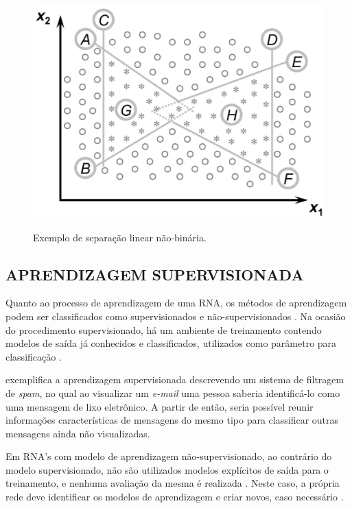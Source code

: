 \begin{figure}[h]
	\caption{Exemplo de separação linear não-binária.}
	\centering %
	\includegraphics[width=12cm]{resources/multilayer_perceptron.png} %
	\label{figura:multilayer_perceptron}	
\end{figure}

\subsection{APRENDIZAGEM SUPERVISIONADA}

Quanto ao processo de aprendizagem de uma RNA, os métodos de aprendizagem podem ser classificados como supervisionados e não-supervisionados \cite{haykin2007redes}. Na ocasião do procedimento supervisionado, há um ambiente de treinamento contendo modelos de saída já conhecidos e classificados, utilizados como parâmetro para classificação \cite{marius2009}.

 exemplifica a aprendizagem supervisionada descrevendo um sistema de filtragem de \textit{spam}, no qual ao visualizar um \textit{e-mail} uma pessoa saberia identificá-lo como uma mensagem de lixo eletrônico. A partir de então, seria possível reunir informações características de mensagens do mesmo tipo para classificar outras mensagens ainda não visualizadas.

Em RNA's com modelo de aprendizagem não-supervisionado, ao contrário do modelo supervisionado, não são utilizados modelos explícitos de saída para o treinamento, e nenhuma avaliação da mesma é realizada \cite{von2005rede}. Neste caso, a própria rede deve identificar os modelos de aprendizagem e criar novos, caso necessário \cite{becker1991}.

